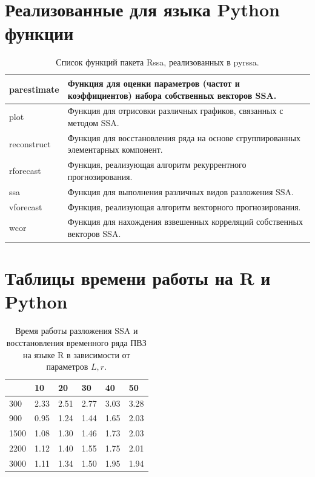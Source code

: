 \documentclass[specialist,
			   substylefile = spbu_report.rtx,
			   subf,href,colorlinks=true, 12pt]{disser}
\begin{document}
\makeatletter

\appendix

\chapter{Реализованные для языка Python функции}

\begin{table}[htp]
	\centering
	\begin{tabularx}{\textwidth}{| l | X |}
		
		\hline
		parestimate & Функция для оценки параметров (частот и коэффициентов) набора собственных векторов SSA. \\
		\hline
		plot & Функция для отрисовки различных графиков, связанных с методом SSA.\\
		\hline
		reconstruct & Функция для восстановления ряда на основе сгруппированных элементарных компонент.\\
		\hline
		rforecast & Функция, реализующая алгоритм рекуррентного прогнозирования.\\
		\hline
		ssa & Функция для выполнения различных видов разложения SSA.\\
		\hline
		vforecast & Функция, реализующая алгоритм векторного прогнозирования.\\
		\hline
		wcor & Функция для нахождения взвешенных корреляций собственных векторов SSA.\\
		\hline
		 
	\end{tabularx}
	\caption{\label{tab:pyrssa-functions} Список функций пакета Rssa, реализованных в pyrssa.}
\end{table}


\chapter{Таблицы времени работы на R и Python}

\begin{table}[htp]
	\centering
	\begin{tabular}{ | l | l | l | l | l | l |}
		
		\hline
		\backslashbox{$L$}{$r$} & 10 & 20 & 30 & 40 & 50 \\ 
		\hline
		300 & 2.33 & 2.51 & 2.77 & 3.03 & 3.28  \\
		\hline
		900 & 0.95 & 1.24 & 1.44 & 1.65 & 2.03 \\
		\hline
		1500 & 1.08 & 1.30 & 1.46 & 1.73 & 2.03 \\
		\hline
		2200 & 1.12 & 1.40 & 1.55 & 1.75 & 2.01 \\
		\hline
		3000 & 1.11 & 1.34 & 1.50 & 1.95 & 1.94 \\
		\hline
	\end{tabular}
	\caption{\label{tab:r-time-table} Время работы разложения SSA и восстановления временного ряда ПВЗ на языке R в зависимости от параметров $L, r$.}
\end{table}
\end{document}
